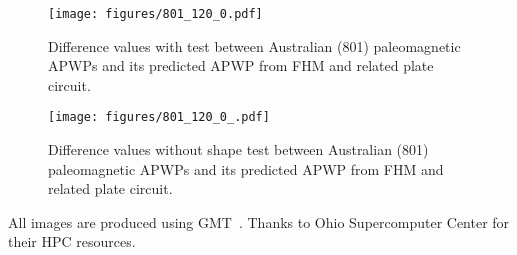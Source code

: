 \begin{figure*}
\centering
\texttt{[image: figures/801\_120\_0.pdf]}
\caption[Differences with test of plate 801's paleomagnetic APWPs versus its FHM
predicted APWP]{Difference values with test between Australian (801)
paleomagnetic APWPs and its predicted APWP from FHM and related plate
circuit.}\label{fig-au-dif}
\end{figure*}

\begin{figure*}
\centering
\texttt{[image: figures/801\_120\_0\_.pdf]}
\caption[Differences without shape test of plate 801's paleomagnetic APWPs
versus its FHM predicted APWP]{Difference values without shape test between
Australian (801) paleomagnetic APWPs and its predicted APWP from FHM and related
plate circuit.}\label{fig-aunt-dif}
\end{figure*}


\begin{acknowledgments}
All images are produced using GMT~\cite{W13}. Thanks to Ohio Supercomputer
Center for their HPC resources.
\end{acknowledgments}

